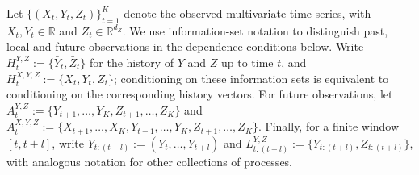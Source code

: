 \documentclass[12pt]{article}
\newcommand{\indep}{\perp \!\!\! \perp}
\newcommand\given{\,|\,}
\numberwithin{equation}{section}
\begin{document}
Let \(\{(X_t,Y_t,Z_t)\}_{t=1}^K\) denote the observed multivariate time series, with \(X_t,Y_t\in\mathbb R\) and \(Z_t\in\mathbb R^{d_Z}\). We use information-set notation to distinguish past, local and future observations in the dependence conditions below. Write \(H_t^{Y,Z}:=\{\bar Y_t,\bar Z_t\}\) for the history of \(Y\) and \(Z\) up to time \(t\), and \(H_t^{X,Y,Z}:=\{\bar X_t,\bar Y_t,\bar Z_t\}\); conditioning on these information sets is equivalent to conditioning on the corresponding history vectors. For future observations, let \(A_t^{Y,Z}:=\{Y_{t+1},\ldots,Y_K,Z_{t+1},\ldots,Z_K\}\) and \(A_t^{X,Y,Z}:=\{X_{t+1},\ldots,X_K,Y_{t+1},\ldots,Y_K,Z_{t+1},\ldots,Z_K\}\). Finally, for a finite window \([t,t+l]\), write \(Y_{t:(t+l)}:=(Y_t,\ldots,Y_{t+l})\) and \(L_{t:(t+l)}^{Y,Z}:=\{Y_{t:(t+l)},Z_{t:(t+l)}\}\), with analogous notation for other collections of processes.




\end{document}
